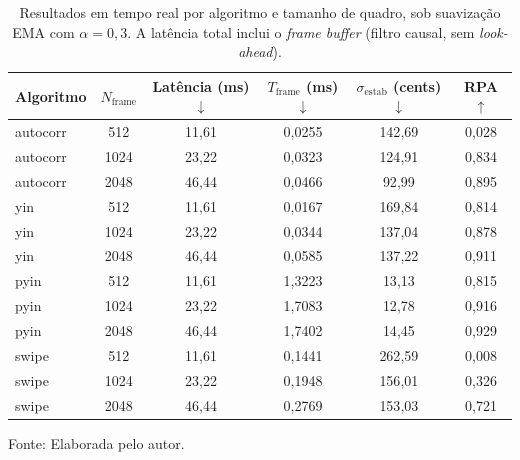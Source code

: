  \begin{table}[H]
  \centering
  \caption{\label{tab:realtime_resumo}Resultados em tempo real por algoritmo e tamanho de quadro, sob suavização EMA com $\alpha = 0{,}3$. A latência total inclui o
  \textit{frame buffer} (filtro causal, sem \textit{look-ahead}).}
  \small
  \begin{tabular}{|l|c|c|c|c|c|}
  \hline
  \textbf{Algoritmo} & \textbf{$N_{\text{frame}}$} &
  \textbf{Latência (ms) $\downarrow$} & \textbf{$T_{\text{frame}}$ (ms) $\downarrow$} &
  \textbf{$\sigma_{\text{estab}}$ (cents) $\downarrow$} & \textbf{RPA $\uparrow$} \\
  \hline
  autocorr & 512  & 11{,}61 & 0{,}0255 & 142{,}69 & 0{,}028 \\
  \hline
  autocorr & 1024 & 23{,}22 & 0{,}0323 & 124{,}91 & 0{,}834 \\
  \hline
  autocorr & 2048 & 46{,}44 & 0{,}0466 & 92{,}99  & 0{,}895 \\
  \hline
  yin      & 512  & 11{,}61 & 0{,}0167 & 169{,}84 & 0{,}814 \\
  \hline
  yin      & 1024 & 23{,}22 & 0{,}0344 & 137{,}04 & 0{,}878 \\
  \hline
  yin      & 2048 & 46{,}44 & 0{,}0585 & 137{,}22 & 0{,}911 \\
  \hline
  pyin     & 512  & 11{,}61 & 1{,}3223 & 13{,}13  & 0{,}815 \\
  \hline
  pyin     & 1024 & 23{,}22 & 1{,}7083 & 12{,}78  & 0{,}916 \\
  \hline
  pyin     & 2048 & 46{,}44 & 1{,}7402 & 14{,}45  & 0{,}929 \\
  \hline
  swipe    & 512  & 11{,}61 & 0{,}1441 & 262{,}59 & 0{,}008 \\
  \hline
  swipe    & 1024 & 23{,}22 & 0{,}1948 & 156{,}01 & 0{,}326 \\
  \hline
  swipe    & 2048 & 46{,}44 & 0{,}2769 & 153{,}03 & 0{,}721 \\
  \hline
  \end{tabular}
  \small Fonte: Elaborada pelo autor.
\end{table}

